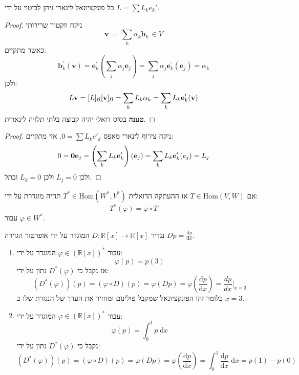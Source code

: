 \documentclass{tstextbook}
\begin{document}
\begin{proposition}
כל פונקציונאל לינארי ניתן לביטוי על ידי \(L=\sum L_{k}e_{k}'\).

\end{proposition}
\begin{proof}
ניקח ווקטור שרירותי $$\mathbf{v}\,=\,\sum_{k}\alpha_{k}\mathbf{b}_{k}\,\in V$$
כאשר מתקיים:
$$\mathbf{b}_{k}^{\prime}(\mathbf{v})=\mathbf{e}_{k}^{\prime}\left(\sum_{j}\alpha_{j}\mathbf{e}_{j}\right)=\sum_{j}\alpha_{j}\mathbf{e}_{k}^{\prime}(\mathbf{e}_{j})=\alpha_{k}$$
ולכן:
$$L{\bf v}=[L]_{\mathcal{B}}[{\bf v}]_{\mathcal{B}}=\sum_{k}L_{k}\alpha_{k}=\sum_{k}L_{k}{\bf e}_{k}^{\prime}({\bf v})$$\textbf{טענה}
בסיס דואלי יהיה קבוצה בלתי תלויה לינארית.

\end{proof}
\begin{proof}
ניקח צירוף לינארי מאפס \(0=\sum L_{k}e'_{k}\). אזי מתקיים:
$$0={\bf0e}_{j}=\left(\sum_{k}L_{k}{\bf e}_{k}^{\prime}\right)({\bf e}_{j})=\sum_{k}L_{k}{\bf e}_{k}^{\prime}({\mathbf{}e}_{j})=L_{j}$$
ולכן \(L_{j}=0\) ולכן \(L_{k}=0\) ובתל. 

\end{proof}
\begin{definition}
אם \(T \in \mathrm{Hom}(V,W)\) אז ההעתקה הדואלית \(T^{*}\in \mathrm{Hom}(W^{*},V^{*})\) תהיה מוגדרת על ידי:
$$T^{*}\left( \varphi \right)=\varphi \circ  T$$
עבור \(\varphi \in W^{*}\).

\end{definition}
\begin{example}
נגדיר \(D:\mathbb{R}[x]\to \mathbb{R}[x]\) המוגדר על ידי אופרטור הגזירה \(Dp=\frac{\mathrm{d} p}{\mathrm{d} x}\).

  \begin{enumerate}
    \item עבור \(\varphi \in \left( \mathbb{R}[x] \right)^{*}\) המוגדר על ידי: 
$$\varphi(p)=p(3)$$
אז נקבל כי \(D^{*}\left( \varphi \right)\) נתון על ידי:
$$\left( D^{*}\left( \varphi \right) \right)(p)=\left( \varphi \circ  D \right)(p)=\varphi(Dp)=\varphi\left( \frac{\mathrm{d} p}{\mathrm{d} x}  \right)=\frac{dp}{dx}|_{x=3}$$
כלומר זהו הפונקציונאל שמקבל פולינום ומחזיר את הערך של הנגזרת שלו ב-\(x=3\).


    \item עבור \(\varphi \in \left( \mathbb{R}[x] \right)^{*}\) המוגדר על ידי: 
$$\varphi(p)=\int_{0}^{1}p\;\mathrm{d}x$$
נקבל כי \(D^{*}( \varphi )\) נתון על ידי:
$$\left( D^{*}\left( \varphi \right) \right)(p)=\left( \varphi \circ  D \right)(p)=\varphi(Dp)=\varphi\left( \frac{\mathrm{d} p}{\mathrm{d} x}  \right)=\int_{0}^{1}\frac{\mathrm{d} p}{\mathrm{d} x} \;\mathrm{d}x=p(1)-p(0)$$


  \end{enumerate}
\end{example}
\end{document}
